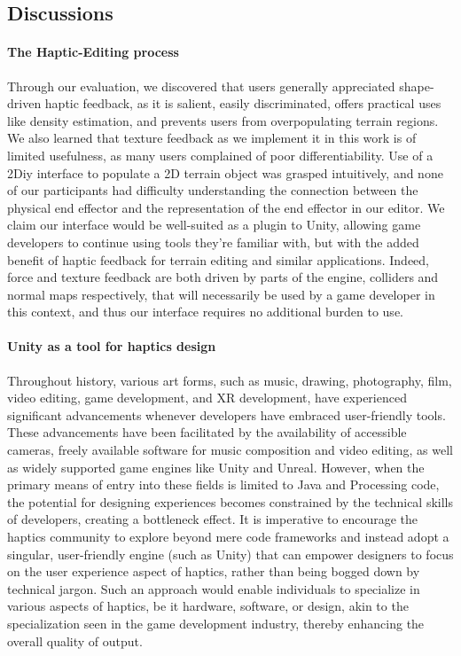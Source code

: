 \subsection{Discussions}

\paragraph{The Haptic-Editing process}

Through our evaluation, we discovered that users generally appreciated shape-driven haptic feedback, as it is salient, easily discriminated, offers practical uses like density estimation, and prevents users from overpopulating terrain regions. We also learned that texture feedback as we implement it in this work is of limited usefulness, as many users complained of poor differentiability. Use of a 2Diy interface to populate a 2D terrain object was grasped intuitively, and none of our participants had difficulty understanding the connection between the physical end effector and the representation of the end effector in our editor. We claim our interface would be well-suited as a plugin to Unity, allowing game developers to continue using tools they're familiar with, but with the added benefit of haptic feedback for terrain editing and similar applications. Indeed, force and texture feedback are both driven by parts of the engine, colliders and normal maps respectively, that will necessarily be used by a game developer in this context, and thus our interface requires no additional burden to use. 

\paragraph{Unity as a tool for haptics design}

Throughout history, various art forms, such as music, drawing, photography, film, video editing, game development, and XR development, have experienced significant advancements whenever developers have embraced user-friendly tools. These advancements have been facilitated by the availability of accessible cameras, freely available software for music composition and video editing, as well as widely supported game engines like Unity and Unreal. However, when the primary means of entry into these fields is limited to Java and Processing code, the potential for designing experiences becomes constrained by the technical skills of developers, creating a bottleneck effect. It is imperative to encourage the haptics community to explore beyond mere code frameworks and instead adopt a singular, user-friendly engine (such as Unity) that can empower designers to focus on the user experience aspect of haptics, rather than being bogged down by technical jargon. Such an approach would enable individuals to specialize in various aspects of haptics, be it hardware, software, or design, akin to the specialization seen in the game development industry, thereby enhancing the overall quality of output.

